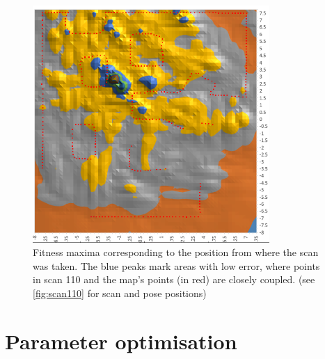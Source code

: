 \documentclass[authoryearcitations]{UoYCSproject}
\begin{document}
\begin{figure}[ht]
\centering
	\includegraphics[width=9cm,keepaspectratio]{images/landscape_overlay.png}
	\caption{Fitness maxima corresponding to the position from where the scan was taken. The blue peaks mark areas with low error, where points in scan 110 and the map's points (in red) are closely coupled. (see \autoref{fig:scan110} for scan and pose positions)}
	\label{fig:landscape}
\end{figure}

\section{Parameter optimisation}
\end{document}
